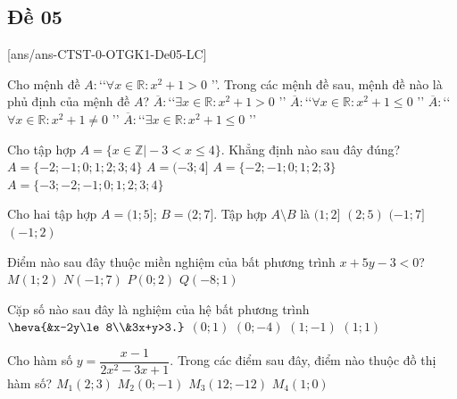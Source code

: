 \subsection{Đề 05}
\caulc
{}[ans/ans-CTST-0-OTGK1-De05-LC]
\begin{ex}%
	Cho mệnh đề $A\colon$\lq\lq $\forall x\in\mathbb{R}\colon x^2+1>0$ \rq\rq. Trong các mệnh đề sau, mệnh đề nào là phủ định của mệnh đề $A$?
	\choice
	{$\overline{A}\colon$\lq\lq$\exists x\in \mathbb{R}\colon x^2+1>0$ \rq\rq}
	{$\overline{A}\colon$\lq\lq$\forall x\in \mathbb{R}\colon x^2+1 \leq 0$ \rq\rq}
	{$\overline{A}\colon$\lq\lq$\forall x\in \mathbb{R}\colon x^2+1 \neq 0$ \rq\rq}
	{\True $\overline{A}\colon $\lq\lq$\exists x\in \mathbb{R}\colon x^2+1 \le 0$ \rq\rq}
\end{ex}
\begin{ex}%
	Cho tập hợp $A=\{x\in\mathbb{Z}\big|-3<x\le 4\}$. Khẳng định nào sau đây đúng?
	\choice
	{\True $A=\{-2;-1;0;1;2;3;4\}$}
	{$A=(-3;4]$}
	{$A=\{-2;-1;0;1;2;3\}$}
	{$A=\{-3;-2;-1;0;1;2;3;4\}$}
\end{ex}
\begin{ex}%
	Cho hai tập hợp $A=(1;5]$; $B=(2;7]$. Tập hợp $A\setminus B$ là
	\choice
	{\True $(1;2]$}
	{$(2;5)$}
	{$(-1;7]$}
	{$(-1;2)$}
	\loigiai{
		Ta có $A\setminus B=(1;2]$. 	
	}
\end{ex}
\begin{ex}%
	Điểm nào sau đây thuộc miền nghiệm của bất phương trình $x+5y-3<0$?
	\choice
	{$M(1;2)$}
	{$N(-1;7)$}
	{$P(0;2)$}
	{\True $Q(-8;1)$}
\end{ex}
\begin{ex}%
	Cặp số nào sau đây là nghiệm của hệ bất phương trình $\heva{&x-2y\le 8\\&3x+y>3.}$
	\choice
	{$(0;1)$}
	{$(0;-4)$}
	{$(1;-1)$}
	{\True $(1;1)$}
\end{ex}
\begin{ex}%
	Cho hàm số $y=\dfrac{x-1}{2x^2-3x+1}$. Trong các điểm sau đây, điểm nào thuộc đồ thị hàm số?
	\choice
	{$M_1(2;3)$}
	{\True $ M_2(0;-1)$}
	{$ M_3(12;-12)$}
	{$ M_4(1;0)$}
\end{ex}
